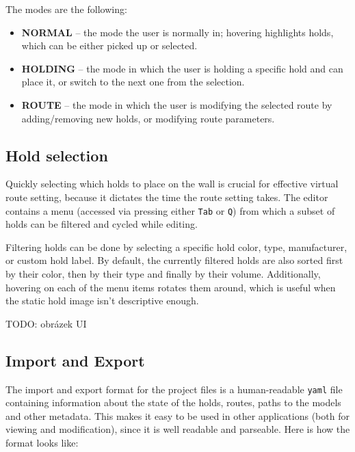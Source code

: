 The modes are the following:

\begin{itemize}
	\item \textbf{NORMAL} -- the mode the user is normally in; hovering highlights holds, which can be either picked up or selected.
	\item \textbf{HOLDING} -- the mode in which the user is holding a specific hold and can place it, or switch to the next one from the selection.
	\item \textbf{ROUTE} -- the mode in which the user is modifying the selected route by adding/removing new holds, or modifying route parameters.
\end{itemize}

\subsection{Hold selection}
Quickly selecting which holds to place on the wall is crucial for effective virtual route setting, because it dictates the time the route setting takes.
The editor contains a menu (accessed via pressing either \verb|Tab| or \verb|Q|) from which a subset of holds can be filtered and cycled while editing.

Filtering holds can be done by selecting a specific hold color, type, manufacturer, or custom hold label.
By default, the currently filtered holds are also sorted first by their color, then by their type and finally by their volume.
Additionally, hovering on each of the menu items rotates them around, which is useful when the static hold image isn't descriptive enough.

TODO: obrázek UI


\subsection{Import and Export}
The import and export format for the project files is a human-readable \verb|yaml| file containing information about the state of the holds, routes, paths to the models and other metadata.
This makes it easy to be used in other applications (both for viewing and modification), since it is well readable and parseable.
Here is how the format looks like:

